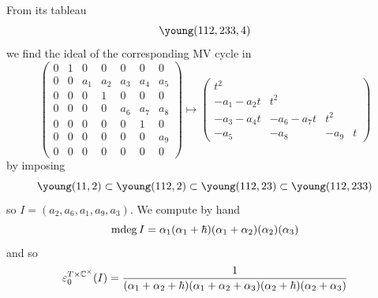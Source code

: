 \documentclass[11pt]{article}
\begin{document}
\begin{description}
    From its tableau 
    $$\young(112,233,4)$$
    we find the ideal of the corresponding MV cycle in 
    $$\begin{pmatrix}
        0&1&0&0&0&0&0\\
        0&0&{a}_{1}&{a}_{2}&{a}_{3}&{a}_{4}&{a}_{5}\\
        0&0&0&1&0&0&0\\
        0&0&0&0&{a}_{6}&{a}_{7}&{a}_{8}\\
        0&0&0&0&0&1&0\\
        0&0&0&0&0&0&{a}_{9}\\
        0&0&0&0&0&0&0\end{pmatrix} \mapsto \begin{pmatrix}
            t^2 & \\
            - a_1 - a_2 t & t^2 \\
            -a_3 -a_4 t & -a_6 - a_7t & t^2 \\
            - a_5 & -a_8 & -a_9 & t
        \end{pmatrix}
    $$
    by imposing 
    $$
    \young(11,2) \subset \young(112,2) \subset \young(112,23) \subset \young(112,233)
    $$
    so $I = \left({a}_{2},{a}_{6},{a}_{1},{a}_{9},{a}_{3}\right)$. 
    We compute by hand 
    $$
    \operatorname{mdeg} I = \alpha_1(\alpha_1 + \hbar)(\alpha_1 + \alpha_2)(\alpha_2)(\alpha_3)
    $$ and so 
    $$
    \varepsilon^{T\times\mathbb C^\times}_0(I) = \frac{1}{(\alpha_1 + \alpha_2 + \hbar)(\alpha_1 + \alpha_2 + \alpha_3)(\alpha_2 + \hbar)(\alpha_2 + \alpha_3)}
    $$
\end{description}

%
%


%
%


%
\end{document}
